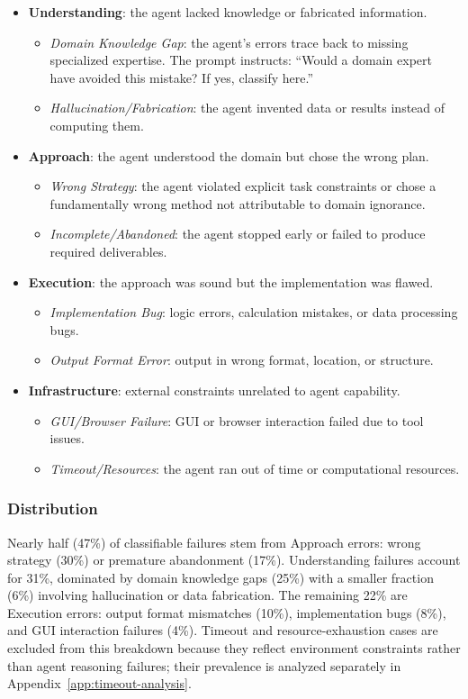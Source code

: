 \documentclass{llmxive}
\begin{document}
\begin{itemize}[leftmargin=*,itemsep=2pt]
    \item \textbf{Understanding}: the agent lacked knowledge or fabricated information.
    \begin{itemize}[itemsep=1pt]
        \item \emph{Domain Knowledge Gap}: the agent's errors trace back to missing specialized expertise. The prompt instructs: ``Would a domain expert have avoided this mistake? If yes, classify here.''
        \item \emph{Hallucination/Fabrication}: the agent invented data or results instead of computing them.
    \end{itemize}
    \item \textbf{Approach}: the agent understood the domain but chose the wrong plan.
    \begin{itemize}[itemsep=1pt]
        \item \emph{Wrong Strategy}: the agent violated explicit task constraints or chose a fundamentally wrong method not attributable to domain ignorance.
        \item \emph{Incomplete/Abandoned}: the agent stopped early or failed to produce required deliverables.
    \end{itemize}
    \item \textbf{Execution}: the approach was sound but the implementation was flawed.
    \begin{itemize}[itemsep=1pt]
        \item \emph{Implementation Bug}: logic errors, calculation mistakes, or data processing bugs.
        \item \emph{Output Format Error}: output in wrong format, location, or structure.
    \end{itemize}
    \item \textbf{Infrastructure}: external constraints unrelated to agent capability.
    \begin{itemize}[itemsep=1pt]
        \item \emph{GUI/Browser Failure}: GUI or browser interaction failed due to tool issues.
        \item \emph{Timeout/Resources}: the agent ran out of time or computational resources.
    \end{itemize}
\end{itemize}

\subsubsection{Distribution}
Nearly half (47\%) of classifiable failures stem from Approach errors: wrong strategy (30\%) or premature abandonment (17\%).
Understanding failures account for 31\%, dominated by domain knowledge gaps (25\%) with a smaller fraction (6\%) involving hallucination or data fabrication.
The remaining 22\% are Execution errors: output format mismatches (10\%), implementation bugs (8\%), and GUI interaction failures (4\%).
Timeout and resource-exhaustion cases are excluded from this breakdown because they reflect environment constraints rather than agent reasoning failures; their prevalence is analyzed separately in Appendix~\ref{app:timeout-analysis}.
\end{document}
